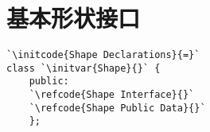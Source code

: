 \section{基本形状接口}\label{sec:基本形状接口}

\begin{lstlisting}
`\initcode{Shape Declarations}{=}`
class `\initvar{Shape}{}` {
    public:
    `\refcode{Shape Interface}{}`
    `\refcode{Shape Public Data}{}`
    };
\end{lstlisting}